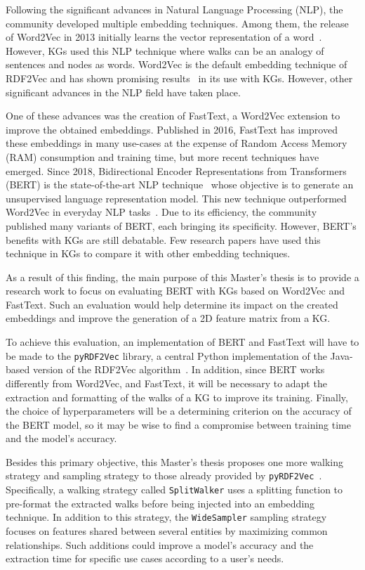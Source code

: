 Following the significant advances in Natural Language Processing (NLP), the
community developed multiple embedding techniques. Among them, the release of
Word2Vec in 2013 initially learns the vector representation of a
word~\citep{inproceedings:mikolov}. However, KGs used this NLP technique where
walks can be an analogy of sentences and nodes as words. Word2Vec is the default
embedding technique of RDF2Vec and has shown promising
results~\citep{DBLP:journals/semweb/RistoskiRNLP19} in its use with
KGs. However, other significant advances in the NLP field have taken place.

One of these advances was the creation of FastText, a Word2Vec extension to
improve the obtained embeddings. Published in 2016, FastText has improved these
embeddings in many use-cases at the expense of Random Access Memory (RAM)
consumption and training time, but more recent techniques have emerged. Since
2018, Bidirectional Encoder Representations from Transformers (BERT) is the
state-of-the-art NLP technique~\citep{inproceedings:devlin} whose objective is
to generate an unsupervised language representation model. This new technique
outperformed Word2Vec in everyday NLP
tasks~\citep{DBLP:conf/embc/SahaLG20,article:beseiso,DBLP:conf/acl/HendrycksLWDKS20}. Due
to its efficiency, the community published many variants of BERT, each bringing
its specificity. However, BERT's benefits with KGs are still debatable. Few
research papers have used this technique in KGs to compare it with other
embedding techniques.

As a result of this finding, the main purpose of this Master's thesis is to
provide a research work to focus on evaluating BERT with KGs based on Word2Vec
and FastText. Such an evaluation would help determine its impact on the created
embeddings and improve the generation of a 2D feature matrix from a KG.

To achieve this evaluation, an implementation of BERT and FastText will have to
be made to the \texttt{pyRDF2Vec} library, a central Python implementation of
the Java-based version of the RDF2Vec algorithm~\citep{pyrdf2vec}. In addition,
since BERT works differently from Word2Vec, and FastText, it will be necessary
to adapt the extraction and formatting of the walks of a KG to improve its
training. Finally, the choice of hyperparameters will be a determining criterion
on the accuracy of the BERT model, so it may be wise to find a compromise
between training time and the model's accuracy.

Besides this primary objective, this Master's thesis proposes one more walking
strategy and sampling strategy to those already provided by
\texttt{pyRDF2Vec}~\citep{inproceedings:cochez}. Specifically, a walking
strategy called \texttt{SplitWalker} uses a splitting function to pre-format the
extracted walks before being injected into an embedding technique. In addition
to this strategy, the \texttt{WideSampler} sampling strategy focuses on features
shared between several entities by maximizing common relationships. Such
additions could improve a model's accuracy and the extraction time for specific
use cases according to a user's needs.

